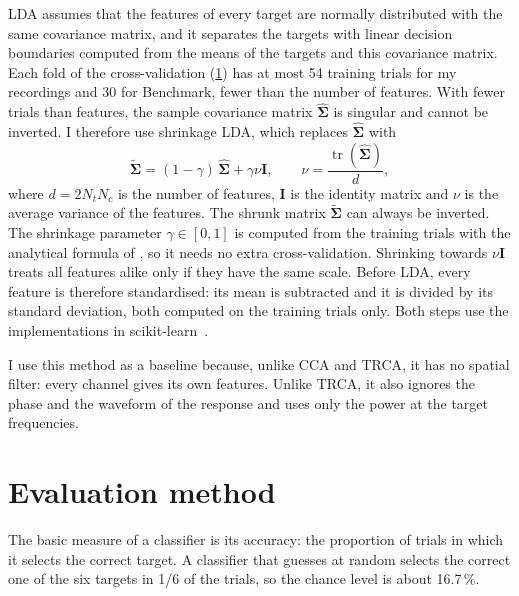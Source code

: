 \ac{LDA} assumes that the features of every target are normally distributed with the same
covariance matrix, and it separates the targets with linear decision boundaries computed from
the means of the targets and this covariance matrix. Each fold of the cross-validation
(\cref{sec:evaluation}) has at most 54 training trials for my recordings and 30 for Benchmark,
fewer than the number of features. With fewer trials than features, the sample covariance
matrix $\hat{\bm{\Sigma}}$ is singular and cannot be inverted. I therefore use shrinkage
\ac{LDA}, which replaces $\hat{\bm{\Sigma}}$ with
\begin{equation}
    \tilde{\bm{\Sigma}} = (1 - \gamma)\,\hat{\bm{\Sigma}} + \gamma \nu \mathbf{I},
    \qquad
    \nu = \frac{\operatorname{tr}(\hat{\bm{\Sigma}})}{d},
    \label{eq:shrinkage}
\end{equation}
where $d = 2 N_t N_c$ is the number of features, $\mathbf{I}$ is the identity matrix and $\nu$
is the average variance of the features. The shrunk matrix $\tilde{\bm{\Sigma}}$ can always be
inverted. The shrinkage parameter $\gamma \in [0, 1]$ is computed from the training trials with
the analytical formula of \citet{ledoit2004shrinkage}, so it needs no extra cross-validation.
Shrinking towards $\nu \mathbf{I}$ treats all features alike only if they have the same scale.
Before \ac{LDA}, every feature is therefore standardised: its mean is subtracted and it is
divided by its standard deviation, both computed on the training trials only. Both steps use
the implementations in scikit-learn~\citep{pedregosa2011sklearn}.

I use this method as a baseline because, unlike \ac{CCA} and \ac{TRCA}, it has no spatial
filter: every channel gives its own features. Unlike \ac{TRCA}, it also ignores the phase and
the waveform of the response and uses only the power at the target frequencies.

\section{Evaluation method}
\label{sec:evaluation}

The basic measure of a classifier is its accuracy: the proportion of trials in which it selects
the correct target. A classifier that guesses at random selects the correct one of the six
targets in 1/6 of the trials, so the chance level is about 16.7\,\%.

